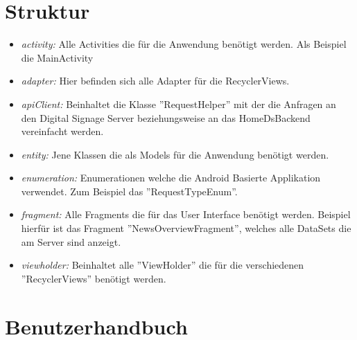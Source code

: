\section{Struktur}
\begin{itemize}
	\item {\em activity:} Alle Activities die für die Anwendung benötigt werden. Als Beispiel die MainActivity
	
	\item {\em adapter:} Hier befinden sich alle Adapter für die RecyclerViews.
	
	\item {\em apiClient:} Beinhaltet die Klasse ''RequestHelper'' mit der die Anfragen an den Digital Signage Server beziehungsweise an das HomeDsBackend vereinfacht werden.
	
	\item {\em entity:} Jene Klassen die als Models für die Anwendung benötigt werden. 
		
	\item {\em enumeration:} Enumerationen welche die Android Basierte Applikation verwendet. Zum Beispiel das ''RequestTypeEnum''.
	
	\item {\em fragment:} Alle Fragments die für das User Interface benötigt werden. Beispiel hierfür ist das Fragment ''NewsOverviewFragment'', welches alle DataSets die am Server sind anzeigt.
	
	\item {\em viewholder:} Beinhaltet alle ''ViewHolder'' die für die verschiedenen ''RecyclerViews'' benötigt werden. 		
\end{itemize}
\section{Benutzerhandbuch}
